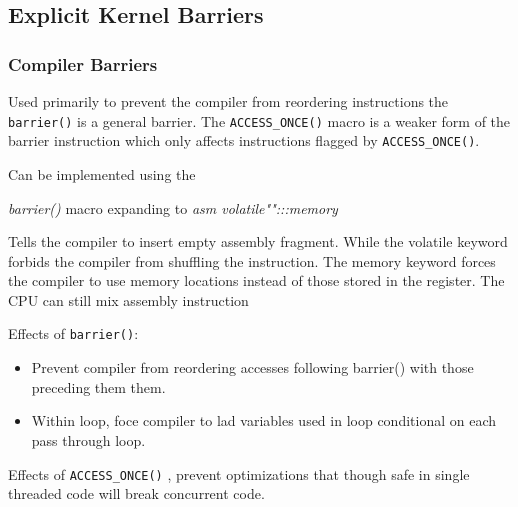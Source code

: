 \documentclass{article}
\begin{document}
\subsection{Explicit Kernel Barriers}

\subsubsection{Compiler Barriers}

Used primarily to prevent the compiler from reordering instructions
the \lstinline{barrier()} is a general barrier. The
\lstinline{ACCESS_ONCE()} macro is a weaker form of the barrier
instruction which only affects instructions flagged by
\lstinline{ACCESS_ONCE()}.

Can be implemented using the

\emph{barrier()} macro expanding to \emph{asm volatile"":::memory}

Tells the compiler to insert empty assembly fragment. While the
volatile keyword forbids the compiler from shuffling the instruction.
The memory keyword forces the compiler to use memory locations instead
of those stored in the register. The CPU can still mix assembly
instruction

Effects of \lstinline{barrier()}:

\begin{itemize}
  \item Prevent compiler from reordering accesses following barrier()
    with those preceding them them.

  \item Within loop, foce compiler to lad variables used in loop
    conditional on each pass through loop.    
\end{itemize}

Effects of \lstinline{ACCESS_ONCE()} , prevent optimizations that
though safe in single threaded code will break concurrent code.
\end{document}
